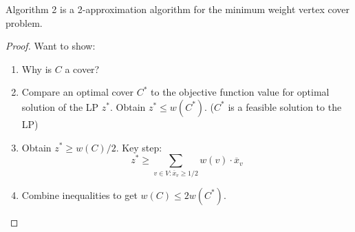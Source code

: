 \documentclass{article}
\newenvironment{theorem}[2][Theorem]{\begin{trivlist}
\item[\hskip \labelsep {\bfseries #1}\hskip \labelsep {\bfseries #2.}]}{\end{trivlist}}
\begin{document}
\begin{theorem}{2.2}
    Algorithm 2 is a 2-approximation algorithm for the minimum weight vertex cover problem.

    \begin{proof}
        Want to show:\vspace{3pt}
        \begin{enumerate}
            \item[] Why is $C$ a cover?\vspace{3pt}
            \item[] Compare an optimal cover $C^*$ to the objective function value for optimal solution of the LP $z^*$. Obtain $z^* \leq w(C^*)$. ($C^*$ is a feasible solution to the LP)\vspace{3pt}
            \item[] Obtain $z^* \geq w(C)/2$. Key step:
                \[
                z^* \geq \sum_{v \in V: \overline{x}_v \geq 1/2} w(v) \cdot \overline{x}_v
                \]
            \item[] Combine inequalities to get $w(C) \leq 2w(C^*)$.
        \end{enumerate}
    \end{proof}
\end{theorem}


\end{document}
